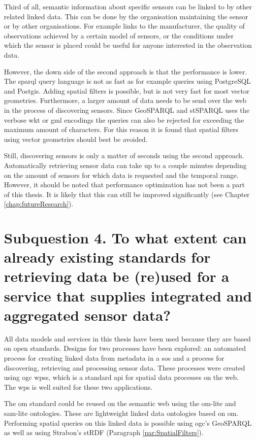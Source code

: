 Third of all, semantic information about specific sensors can be linked to by other related linked data. This can be done by the organisation maintaining the sensor or by other organisations. For example links to the manufacturer, the quality of observations achieved by a certain model of sensors, or the conditions under which the sensor is placed could be useful for anyone interested in the observation data. 

However, the down side of the second approach is that the performance is lower. The \ac{sparql} query language is not as fast as for example queries using PostgreSQL and Postgis. Adding spatial filters is possible, but is not very fast for most vector geometries. Furthermore, a larger amount of data needs to be send over the web in the process of discovering sensors. Since GeoSPARQL and stSPARQL uses the verbose \ac{wkt} or \ac{gml} encodings the queries can also be rejected for exceeding the maximum amount of characters. For this reason it is found that spatial filters using vector geometries should best be avoided. 

Still, discovering sensors is only a matter of seconds using the second approach. Automatically retrieving sensor data can take up to a couple minutes depending on the amount of sensors for which data is requested and the temporal range. However, it should be noted that performance optimization has not been a part of this thesis. It is likely that this can still be improved significantly (see Chapter \ref{chap:futureResearch}).              


\section*{\textbf{Subquestion 4.} To what extent can already existing standards for retrieving data be (re)used for a service that supplies integrated and aggregated sensor data?}%

All data models and services in this thesis have been used because they are based on open standards. Designs for two processes have been explored: an automated process for creating linked data from metadata in a \ac{sos} and a process for discovering, retrieving and processing sensor data. These processes were created using \ac{ogc} \aclp{wps}, which is a standard \ac{api} for spatial data processes on the web. The \ac{wps} is well suited for these two applications.

The \ac{om} standard could be reused on the semantic web using the om-lite and sam-lite ontologies. These are lightweight linked data ontologies based on \ac{om}. Performing spatial queries on this linked data is possible using \ac{ogc}'s GeoSPARQL as well as using Strabon's stRDF (Paragraph \ref{par:SpatialFilters}).

